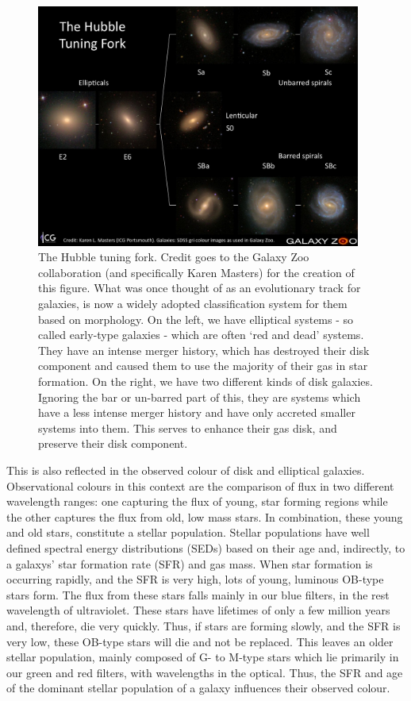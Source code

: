 \begin{figure}
    \centering
    \includegraphics[width=0.95\textwidth]{Introduction/figures/hubble-tuning-fork.jpg}
    \caption[The Hubble tuning fork.]{The Hubble tuning fork. Credit goes to the Galaxy Zoo collaboration (and specifically Karen Masters) for the creation of this figure. What was once thought of as an evolutionary track for galaxies, is now a widely adopted classification system for them based on morphology. On the left, we have elliptical systems - so called early-type galaxies - which are often `red and dead' systems. They have an intense merger history, which has destroyed their disk component and caused them to use the majority of their gas in star formation. On the right, we have two different kinds of disk galaxies. Ignoring the bar or un-barred part of this, they are systems which have a less intense merger history and have only accreted smaller systems into them. This serves to enhance their gas disk, and preserve their disk component.}
    \label{fig:hubble-tuning}
\end{figure}

This is also reflected in the observed colour of disk and elliptical galaxies. Observational colours in this context are the comparison of flux in two different wavelength ranges: one capturing the flux of young, star forming regions while the other captures the flux from old, low mass stars. In combination, these young and old stars, constitute a stellar population. Stellar populations have well defined spectral energy distributions (SEDs) based on their age and, indirectly, to a galaxys' star formation rate (SFR) and gas mass. When star formation is occurring rapidly, and the SFR is very high, lots of young, luminous OB-type stars form. The flux from these stars falls mainly in our blue filters, in the rest wavelength of ultraviolet. These stars have lifetimes of only a few million years and, therefore, die very quickly. Thus, if stars are forming slowly, and the SFR is very low, these OB-type stars will die and not be replaced. This leaves an older stellar population, mainly composed of G- to M-type stars which lie primarily in our green and red filters, with wavelengths in the optical. Thus, the SFR and age of the dominant stellar population of a galaxy influences their observed colour.

